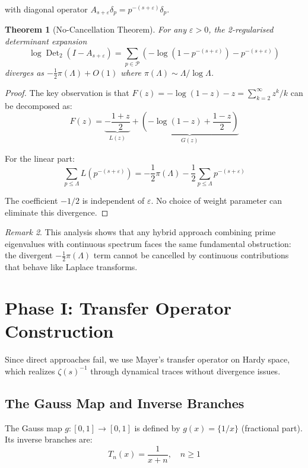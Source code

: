 \documentclass[11pt,a4paper]{article}
\newtheorem{theorem}{Theorem}[section]
\theoremstyle{definition}
\theoremstyle{remark}
\newtheorem{remark}[theorem]{Remark}
\newcommand{\calP}{\mathcal{P}}
\DeclareMathOperator{\Det}{Det} %
\let\det\relax
\DeclareMathOperator{\det}{det}   %
\begin{document}
with diagonal operator $A_{s+\varepsilon} \delta_p = p^{-(s+\varepsilon)} \delta_p$.

\begin{theorem}[No-Cancellation Theorem]
For any $\varepsilon > 0$, the 2-regularised determinant expansion
\[
\log \Det_2(I - A_{s+\varepsilon}) = \sum_{p \in \calP} \left(-\log(1-p^{-(s+\varepsilon)}) - p^{-(s+\varepsilon)}\right)
\]
diverges as $-\frac{1}{2}\pi(\Lambda) + O(1)$ where $\pi(\Lambda) \sim \Lambda/\log \Lambda$.
\end{theorem}

\begin{proof}
The key observation is that $F(z) = -\log(1-z) - z = \sum_{k=2}^{\infty} z^k/k$ 
can be decomposed as:
\[
F(z) = \underbrace{-\frac{1+z}{2}}_{L(z)} + \underbrace{\left(-\log(1-z) + \frac{1-z}{2}\right)}_{G(z)}
\]

For the linear part:
\[
\sum_{p \leq \Lambda} L(p^{-(s+\varepsilon)}) = -\frac{1}{2}\pi(\Lambda) - \frac{1}{2}\sum_{p \leq \Lambda} p^{-(s+\varepsilon)}
\]

The coefficient $-1/2$ is independent of $\varepsilon$. No choice of weight parameter can eliminate this divergence.
\end{proof}

\begin{remark}
This analysis shows that any hybrid approach combining prime eigenvalues with continuous spectrum faces the same fundamental obstruction: the divergent $-\frac{1}{2}\pi(\Lambda)$ term cannot be cancelled by continuous contributions that behave like Laplace transforms.
\end{remark}

\section{Phase I: Transfer Operator Construction}\label{sec:phase1}

Since direct approaches fail, we use Mayer's transfer operator on Hardy space, which realizes $\zeta(s)^{-1}$ through dynamical traces without divergence issues.

\subsection{The Gauss Map and Inverse Branches}

The Gauss map $g: [0,1] \to [0,1]$ is defined by $g(x) = \{1/x\}$ (fractional part).
Its inverse branches are:
\[
T_n(x) = \frac{1}{x+n}, \quad n \geq 1
\]
\end{document}
